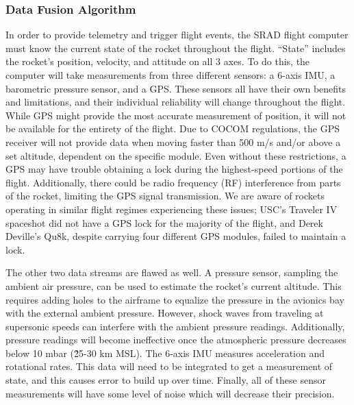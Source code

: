 \subsubsection{Data Fusion Algorithm} \label{section:data-fusion}

In order to provide telemetry and trigger flight events, the SRAD flight computer must know the current state of the rocket throughout the flight. ``State'' includes the rocket’s position, velocity, and attitude on all 3 axes. To do this, the computer will take measurements from three different sensors: a 6-axis IMU, a barometric pressure sensor, and a GPS. These sensors all have their own benefits and limitations, and their individual reliability will change throughout the flight. While GPS might provide the most accurate measurement of position, it will not be available for the entirety of the flight. Due to COCOM regulations, the GPS receiver will not provide data when moving faster than 500 m/s and/or above a set altitude, dependent on the specific module. Even without these restrictions, a GPS may have trouble obtaining a lock during the highest-speed portions of the flight. Additionally, there could be radio frequency (RF) interference from parts of the rocket, limiting the GPS signal transmission. We are aware of rockets operating in similar flight regimes experiencing these issues; USC's Traveler IV spaceshot did not have a GPS lock for the majority of the flight, and Derek Deville's Qu8k, despite carrying four different GPS modules, failed to maintain a lock.

The other two data streams are flawed as well. A pressure sensor, sampling the ambient air pressure, can be used to estimate the rocket’s current altitude. This requires adding holes to the airframe to equalize the pressure in the avionics bay with the external ambient pressure. However, shock waves from traveling at supersonic speeds can interfere with the ambient pressure readings. Additionally, pressure readings will become ineffective once the atmospheric pressure decreases below 10 mbar (\~25-30 km MSL). The 6-axis IMU measures acceleration and rotational rates. This data will need to be integrated to get a measurement of state, and this causes error to build up over time. Finally, all of these sensor measurements will have some level of noise which will decrease their precision.

